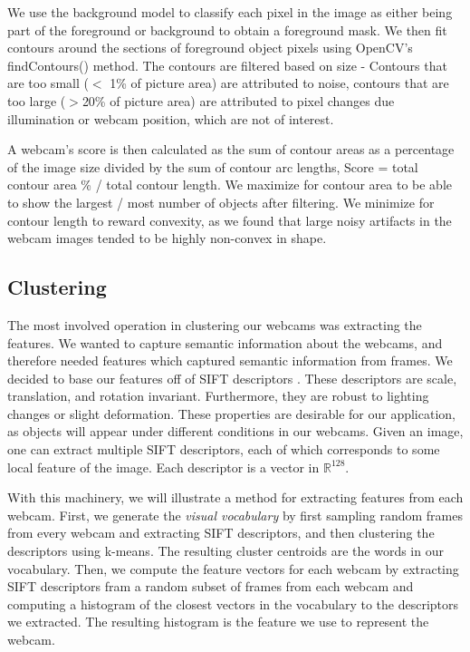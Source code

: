\documentclass[10pt]{article} %
\begin{document}
We use the background model to classify each pixel in the image as either being part of the foreground or background to obtain a foreground mask. We then fit contours around the sections of foreground object pixels using OpenCV's findContours() method. The contours are filtered based on size - Contours that are too small ($<$ 1\% of picture area) are attributed to noise, contours that are too large ($>$20\% of picture area) are attributed to pixel changes due illumination or webcam position, which are not of interest. 

A webcam's score is then calculated as the sum of contour areas as a percentage of the image size divided by the sum of contour arc lengths, Score = total contour area \% / total contour length. We maximize for contour area to be able to show the largest / most number of objects after filtering. We minimize for contour length to reward convexity, as we found that large noisy artifacts in the webcam images tended to be highly non-convex in shape. 

\subsection{Clustering}
The most involved operation in clustering our webcams was extracting the
features. We wanted to capture semantic information about the webcams, and
therefore needed features which captured semantic information from frames. We
decided to base our features off of SIFT descriptors \cite{lowe}. These
descriptors are scale, translation, and rotation invariant. Furthermore, they
are robust to lighting changes or slight deformation. These properties are
desirable for our application, as objects will appear under different
conditions in our webcams. Given an image, one can extract multiple SIFT
descriptors, each of which corresponds to some local feature of the image. Each
descriptor is a vector in $\mathbb{R}^{128}$.

With this machinery, we will illustrate a method for extracting features from
each webcam. First, we generate the \textit{visual vocabulary} by first
sampling random frames from every webcam and extracting SIFT descriptors, and
then clustering the descriptors using k-means. The resulting cluster centroids
are the words in our vocabulary. Then, we compute the feature vectors for each
webcam by extracting SIFT descriptors fram a random subset of frames from each
webcam and computing a histogram of the closest vectors in the vocabulary to
the descriptors we extracted. The resulting histogram is the feature we use to
represent the webcam.
\end{document}
